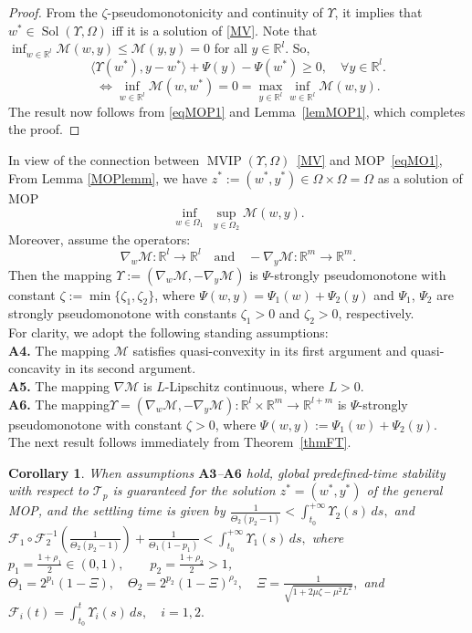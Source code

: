 \documentclass{article}
\theoremstyle{plain}%
\newtheorem{corollary}{Corollary}[section]%
\theoremstyle{thmstyletwo}%
\theoremstyle{thmstylethree}%
\begin{document}
\begin{proof}
From the $\zeta$-pseudomonotonicity and continuity of $\Upsilon$, it implies that $w^* \in \operatorname{Sol}(\Upsilon, \Omega)$ iff it is a solution of \eqref{MV}. Note that $\inf_{w\in \mathbb{R}^l} \mathcal{M}(w,y) \leq \mathcal{M}(y,y) = 0$ for all $y \in \mathbb{R}^l$. So,
\[
\langle \Upsilon(w^*), y - w^* \rangle + \Psi(y) - \Psi(w^*) \geq 0, \quad \forall y \in \mathbb{R}^l.
\]
\begin{equation}\label{eqMOP1}
    \Leftrightarrow \inf_{w\in \mathbb{R}^l} \mathcal{M}(w,w^*) = 0 = \max_{y \in \mathbb{R}^l} \inf_{w\in \mathbb{R}^l} \mathcal{M}(w,y).
\end{equation}
The result now follows from \eqref{eqMOP1} and Lemma~\ref{lemMOP1}, which completes the proof.
\end{proof}
In view of the connection between $\operatorname{MVIP}(\Upsilon, \Omega)$~\eqref{MV} and MOP~\eqref{eqMO1}, From Lemma \eqref{MOPlemm}, we have \(z^{*} := (w^*,y^{*})\in\Omega\times\Omega=\Omega\) as a solution of MOP
\[
\inf_{w \in \Omega_{1}} \ \sup_{y\in \Omega_{2}} \mathcal{M}(w,y).
\]
Moreover, assume the operators:
\[
\nabla_w \mathcal{M} : \mathbb{R}^l \to \mathbb{R}^l
\quad \text{and} \quad
-\nabla_y \mathcal{M} : \mathbb{R}^m \to \mathbb{R}^m.
\]
Then the mapping
\(
\Upsilon := (\nabla_w \mathcal{M}, -\nabla_y \mathcal{M})
\)
is $\Psi$-strongly pseudomonotone with constant $\zeta:=\min\{\zeta_1,\zeta_2\}$, where
$\Psi(w,y)=\Psi_1(w)+\Psi_2(y)$ and $\Psi_1$, $\Psi_2$ are strongly pseudomonotone
with constants $\zeta_1>0$ and $\zeta_2>0$, respectively.
\\[2mm]
For clarity, we adopt the following standing assumptions:
\\[2mm]
\noindent
 \textbf{A4.} The mapping $\mathcal{M}$ satisfies quasi-convexity in its first argument and quasi-concavity in its second argument.
\\[2mm]
\textbf{A5.} The mapping $\nabla \mathcal{M}$ is $L$-Lipschitz continuous, where $L>0$.
\\[2mm]
 \textbf{A6.} The mapping\(\Upsilon= (\nabla_w \mathcal{M},-\nabla_y \mathcal{M}):\mathbb{R}^l\times \mathbb{R}^m\to \mathbb{R}^{l+m}\) is \(\Psi\)-strongly pseudomonotone with constant \(\zeta>0\), where \(\Psi(w,y):=\Psi_1(w)+\Psi_2(y)\).\\[2mm]
The next result follows immediately from Theorem~\eqref{thmFT}.\\
\begin{corollary}
When assumptions $\textbf{A3}$--$\textbf{A6}$ hold, global predefined-time stability with respect to $\mathcal{T}_p$ is guaranteed for the solution $z^{*}=(w^*,y^{*})$ of the general MOP, and the settling time is given by
\(\frac{1}{\Theta_2(p_2-1)} < \int_{t_0}^{+\infty} \Upsilon_2(s)\,ds,\)
and
\(
\mathcal{F}_1\circ \mathcal{F}_2^{-1}
\!\left(\frac{1}{\Theta_2(p_2-1)}\right)
+\frac{1}{\Theta_1(1-p_1)}
<
\int_{t_0}^{+\infty} \Upsilon_1(s)\,ds,\)
where
\(
p_1=\frac{1+\rho_1}{2}\in(0,1),\qquad
p_2=\frac{1+\rho_2}{2}>1
\),
\(
\Theta_1 =2^{p_1}(1- \Xi),\quad
\Theta_2 =2^{p_2}(1- \Xi)^{\rho_2},
\quad
\Xi=\frac{1}{\sqrt{1+2\mu\zeta-\mu^2L^2}},
\)
and
\(
\mathcal{F}_i(t)=\int_{t_0}^t \Upsilon_i(s)\,ds,\quad i=1,2.
\)  
\end{corollary}
\end{document}
